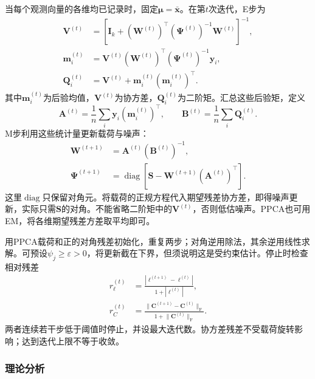 当每个观测向量的各维均已记录时，固定$\bm{\mu}=\bar{\bm{x}}$。在第$t$次迭代，E步为
\begin{equation}
\label{eq:dim-fa-estep}
\begin{aligned}
\bm{V}^{(t)}
&=\left[\bm{I}_k+
(\bm{W}^{(t)})^\top(\bm{\Psi}^{(t)})^{-1}
\bm{W}^{(t)}\right]^{-1},\\
\bm{m}_i^{(t)}
&=\bm{V}^{(t)}(\bm{W}^{(t)})^\top
(\bm{\Psi}^{(t)})^{-1}\bm{y}_i,\\
\bm{Q}_i^{(t)}
&=\bm{V}^{(t)}+\bm{m}_i^{(t)}(\bm{m}_i^{(t)})^\top.
\end{aligned}
\end{equation}
其中$\bm{m}_i^{(t)}$为后验均值，$\bm{V}^{(t)}$为协方差，$\bm{Q}_i^{(t)}$为二阶矩。汇总这些后验矩，定义
\[
\bm{A}^{(t)}=\frac1n\sum_i\bm{y}_i(\bm{m}_i^{(t)})^\top,
\qquad
\bm{B}^{(t)}=\frac1n\sum_i\bm{Q}_i^{(t)}.
\]
M步利用这些统计量更新载荷与噪声：
\begin{equation}
\label{eq:dim-fa-mstep}
\begin{aligned}
\bm{W}^{(t+1)}&=\bm{A}^{(t)}(\bm{B}^{(t)})^{-1},\\
\bm{\Psi}^{(t+1)}
&=\operatorname{diag}\left[
\bm{S}-\bm{W}^{(t+1)}(\bm{A}^{(t)})^\top
\right].
\end{aligned}
\end{equation}
这里$\operatorname{diag}$只保留对角元。将载荷的正规方程代入期望残差协方差，即得噪声更新，实际只需$\bm{S}$的对角。不能省略二阶矩中的$\bm{V}^{(t)}$，否则低估噪声。PPCA也可用EM，将各维期望残差方差取平均即可。

用PPCA载荷和正的对角残差初始化，重复两步；对角逆用除法，其余逆用线性求解。可预设$\psi_j\geq\varepsilon>0$，将更新截在下界，但须说明这是受约束估计。停止时检查相对残差
\begin{equation}
\label{eq:dim-fa-stopping}
\begin{aligned}
r_\ell^{(t)}
&=\frac{|\ell^{(t+1)}-\ell^{(t)}|}{1+|\ell^{(t)}|},\\
r_C^{(t)}
&=\frac{\lVert\bm{C}^{(t+1)}-\bm{C}^{(t)}\rVert_{\mathrm{F}}}
{1+\lVert\bm{C}^{(t)}\rVert_{\mathrm{F}}}.
\end{aligned}
\end{equation}
两者连续若干步低于阈值时停止，并设最大迭代数。协方差残差不受载荷旋转影响；达到迭代上限不等于收敛。

\subsubsection{理论分析}
\label{sec:dim-ppca-analysis}

